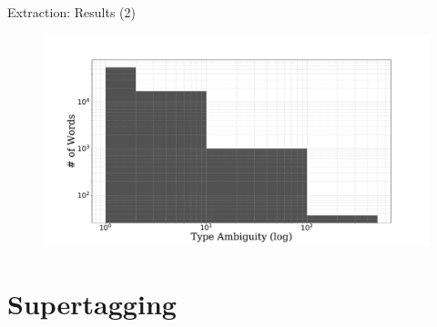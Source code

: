 \documentclass{beamer}
\begin{document}
{
\begin{frame}{Extraction: Results (2)}
\begin{figure}
\includegraphics[scale=0.24]{ambiguity.pdf}
\end{figure}
\end{frame}
}

\section{Supertagging}
\end{document}
